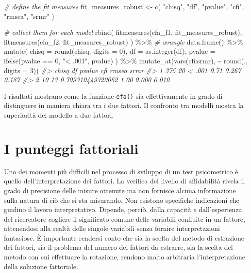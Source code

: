 \documentclass[
  11pt,
]{krantz}
\makeatletter
\newenvironment{Shaded}{\begin{snugshade}}{\end{snugshade}}
\newcommand{\AttributeTok}[1]{\textcolor[rgb]{0.61,0.61,0.61}{#1}}
\newcommand{\CommentTok}[1]{\textcolor[rgb]{0.37,0.37,0.37}{\textit{#1}}}
\newcommand{\DecValTok}[1]{\textcolor[rgb]{0.06,0.06,0.06}{#1}}
\newcommand{\FunctionTok}[1]{\textcolor[rgb]{0,0,0}{#1}}
\newcommand{\NormalTok}[1]{#1}
\newcommand{\OtherTok}[1]{\textcolor[rgb]{0.37,0.37,0.37}{#1}}
\newcommand{\SpecialCharTok}[1]{\textcolor[rgb]{0,0,0}{#1}}
\newcommand{\StringTok}[1]{\textcolor[rgb]{0.5,0.5,0.5}{#1}}
\newenvironment{kframe}{%
\medskip{}
\setlength{\fboxsep}{.8em}
 \def\at@end@of@kframe{}%
 \ifinner\ifhmode%
  \def\at@end@of@kframe{\end{minipage}}%
  \begin{minipage}{\columnwidth}%
 \fi\fi%
 \def\FrameCommand##1{\hskip\@totalleftmargin \hskip-\fboxsep
 \colorbox{shadecolor}{##1}\hskip-\fboxsep
     \hskip-\linewidth \hskip-\@totalleftmargin \hskip\columnwidth}%
 \MakeFramed {\advance\hsize-\width
   \@totalleftmargin\z@ \linewidth\hsize
   \@setminipage}}%
 {\par\unskip\endMakeFramed%
 \at@end@of@kframe}
\renewenvironment{Shaded}{\begin{kframe}}{\end{kframe}}
\theoremstyle{definition}
\theoremstyle{definition}
\theoremstyle{definition}
\theoremstyle{definition}
\theoremstyle{remark}
\makeatother
\begin{document}
\begin{Shaded}
\begin{Highlighting}[]
\CommentTok{\# define the fit measures}
\NormalTok{fit\_measures\_robust }\OtherTok{\textless{}{-}} \FunctionTok{c}\NormalTok{(}
  \StringTok{"chisq"}\NormalTok{, }\StringTok{"df"}\NormalTok{, }\StringTok{"pvalue"}\NormalTok{,}
  \StringTok{"cfi"}\NormalTok{, }\StringTok{"rmsea"}\NormalTok{, }\StringTok{"srmr"}
\NormalTok{)}

\CommentTok{\# collect them for each model}
\FunctionTok{rbind}\NormalTok{(}
  \FunctionTok{fitmeasures}\NormalTok{(efa\_f1, fit\_measures\_robust),}
  \FunctionTok{fitmeasures}\NormalTok{(efa\_f2, fit\_measures\_robust)}
\NormalTok{) }\SpecialCharTok{\%\textgreater{}\%}
  \CommentTok{\# wrangle}
  \FunctionTok{data.frame}\NormalTok{() }\SpecialCharTok{\%\textgreater{}\%}
  \FunctionTok{mutate}\NormalTok{(}
    \AttributeTok{chisq =} \FunctionTok{round}\NormalTok{(chisq, }\AttributeTok{digits =} \DecValTok{0}\NormalTok{),}
    \AttributeTok{df =} \FunctionTok{as.integer}\NormalTok{(df),}
    \AttributeTok{pvalue =} \FunctionTok{ifelse}\NormalTok{(pvalue }\SpecialCharTok{==} \DecValTok{0}\NormalTok{, }\StringTok{"\textless{} .001"}\NormalTok{, pvalue)}
\NormalTok{  ) }\SpecialCharTok{\%\textgreater{}\%}
  \FunctionTok{mutate\_at}\NormalTok{(}\FunctionTok{vars}\NormalTok{(cfi}\SpecialCharTok{:}\NormalTok{srmr), }\SpecialCharTok{\textasciitilde{}} \FunctionTok{round}\NormalTok{(., }\AttributeTok{digits =} \DecValTok{3}\NormalTok{))}
\CommentTok{\#\textgreater{}   chisq df            pvalue  cfi rmsea  srmr}
\CommentTok{\#\textgreater{} 1   375 20            \textless{} .001 0.71 0.267 0.187}
\CommentTok{\#\textgreater{} 2    10 13 0.709310449320062 1.00 0.000 0.010}
\end{Highlighting}
\end{Shaded}

I risultati mostrano come la funzione \texttt{efa()} sia effettivamente in grado di distinguere in maniera chiara tra i due fattori. Il confronto tra modelli mostra la superiorità del modello a due fattori.

\hypertarget{ch:factor-scores}{%
\chapter{I punteggi fattoriali}\label{ch:factor-scores}}

Uno dei momenti più difficili nel processo di sviluppo di un test psicometrico è quello dell'interpretazione dei fattori. La verifica del livello di affidabilità rivela il grado di precisione delle misure ottenute ma non fornisce alcuna informazione sulla natura di ciò che si sta misurando. Non esistono specifiche indicazioni che guidino il lavoro interpretativo. Dipende, perciò, dalla capacità e dall'esperienza del ricercatore cogliere il significato comune delle variabili confluite in un fattore, attenendosi alla realtà delle singole variabili senza fornire interpretazioni fantasiose. È importante rendersi conto che sia la scelta del metodo di estrazione dei fattori, sia il problema del numero dei fattori da estrarre, sia la scelta del metodo con cui effettuare la rotazione, rendono molto arbitraria l'interpretazione della soluzione fattoriale.
\end{document}

